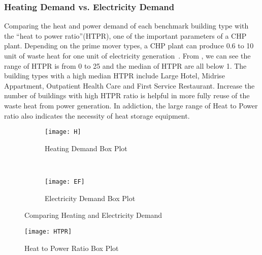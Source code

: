 \subsubsection{Heating Demand vs. Electricity Demand}
Comparing the heat and power demand of each benchmark building type
with the ``heat to power ratio''(HTPR), one of the important
parameters of a CHP plant. Depending on the prime mover types, a CHP
plant can produce 0.6 to 10 unit of waste heat for one unit of
electricity generation~\cite{introCHP2010}. From , we
can see the range of HTPR is from 0 to 25 and the median of HTPR are
all below 1. The building types with a high median HTPR include Large
Hotel, Midrise Appartment, Outpatient Health Care and First Service
Restaurant. Increase the number of buildings with high HTPR ratio is
helpful in more fully reuse of the waste heat from power
generation. In addiction, the large range of Heat to Power ratio also
indicates the necessity of heat storage equipment.
\begin{figure}[h!]
  \centering
  \begin{subfigure}{0.4\textwidth}
  \centering
  \texttt{[image: H]}
  \caption[Heating Demand Box Plot]{Heating Demand Box
    Plot}
  \label{fig:H}
\end{subfigure}
~
\begin{subfigure}{0.4\textwidth}
  \centering
  \texttt{[image: EF]}
  \caption[Electricity Demand Box Plot]{Electricity Demand Box Plot}
  \label{fig:EF2}
\end{subfigure}
\caption[Comparing Heating and Electricity Demand]{Comparing Heating
  and Electricity Demand}
\end{figure}

\begin{figure}[h!]
  \centering
  \texttt{[image: HTPR]}
  \caption[Heat to Power Ratio Box Plot]{Heat to Power Ratio Box Plot}
  \label{fig:HTPR}
\end{figure}%

